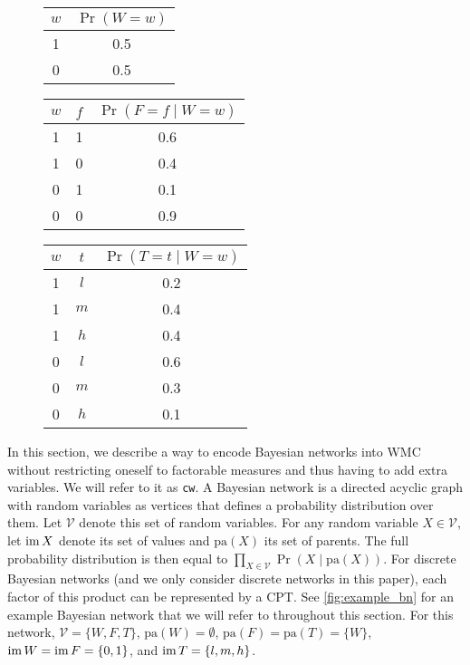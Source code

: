 \begin{figure*}
  \centering
  \begin{subfigure}{0.2\textwidth}
    \centering
  \end{subfigure}%
  \begin{subfigure}{0.8\textwidth}
    \centering
    \begin{tabular}[t]{cc}
      \toprule
      $w$ & $\Pr(W = w)$ \\
      \midrule
      1 & 0.5 \\
      0 & 0.5 \\
      \bottomrule
    \end{tabular}
    \begin{tabular}[t]{ccc}
      \toprule
      $w$ & $f$ & $\Pr(F = f \mid W = w)$ \\
      \midrule
      1 & 1 & 0.6 \\
      1 & 0 & 0.4 \\
      0 & 1 & 0.1 \\
      0 & 0 & 0.9 \\
      \bottomrule
    \end{tabular}
    \begin{tabular}[t]{ccc}
      \toprule
      $w$ & $t$ & $\Pr(T = t \mid W = w)$ \\
      \midrule
      1 & $l$ & 0.2 \\
      1 & $m$ & 0.4 \\
      1 & $h$ & 0.4 \\
      0 & $l$ & 0.6 \\
      0 & $m$ & 0.3 \\
      0 & $h$ & 0.1 \\
      \bottomrule
    \end{tabular}
  \end{subfigure}
  \caption{An example Bayesian network with its CPTs.}
  \label{fig:example_bn}
\end{figure*}

In this section, we describe a way to encode Bayesian networks into WMC without
restricting oneself to factorable measures and thus having to add extra
variables. We will refer to it as \texttt{cw}. A Bayesian network is a directed
acyclic graph with random variables as vertices that defines a probability
distribution over them. Let $\mathcal{V}$ denote this set of random variables.
For any random variable $X \in \mathcal{V}$, let $\operatorname{im} X$ denote its set of
values and $\mathrm{pa}(X)$ its set of parents. The full probability
distribution is then equal to $\prod_{X \in \mathcal{V}} \Pr(X \mid
\mathrm{pa}(X))$. For discrete Bayesian networks (and we only consider discrete
networks in this paper), each factor of this product can be represented by a
CPT. See \cref{fig:example_bn} for an example Bayesian network that we will
refer to throughout this section. For this network, $\mathcal{V} = \{ W, F, T
\}$, $\mathrm{pa}(W) = \emptyset$, $\mathrm{pa}(F) = \mathrm{pa}(T) = \{ W \}$,
$\operatorname{im} W = \operatorname{im} F = \{0, 1 \}$, and $\operatorname{im} T = \{ l, m, h \}$.


